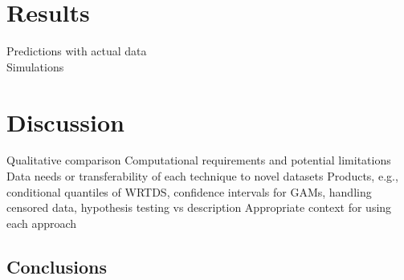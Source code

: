 \documentclass[letterpaper,12pt,oneside]{article}\usepackage[]{graphicx}\usepackage[]{color}
\begin{document}
\section{Results}

\begin{outline}
\0 \noindent Predictions with actual data \\
\0 \noindent Simulations
\end{outline} 

\section{Discussion}

\begin{outline}
\0 \noindent Qualitative comparison
\1 Computational requirements and potential limitations
\1 Data needs or transferability of each technique to novel datasets
\1 Products, e.g., conditional quantiles of \ac{WRTDS}, confidence intervals for \acp{GAM}, handling censored data, hypothesis testing vs description
\1 Appropriate context for using each approach
\end{outline}

\subsection{Conclusions}

\clearpage
\begin{singlespace}


\end{singlespace}
\clearpage

\end{document}
